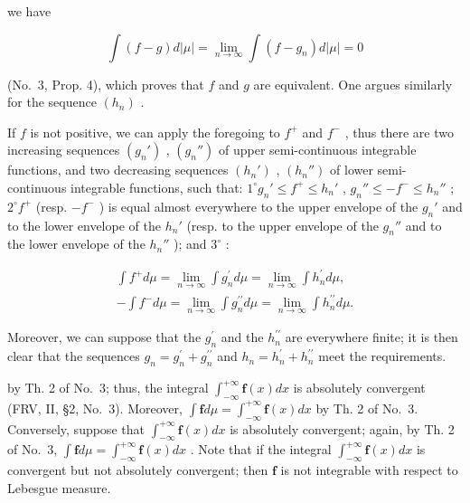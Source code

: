 we have

\[
\int (f - g) d | \mu | = \lim _ {n \rightarrow \infty} \int (f - g _ {n}) d | \mu | = 0
\]

(No.~3, Prop. 4), which proves that \(f\) and \(g\) are equivalent. One argues similarly for the sequence \((h_n)\) .

If \(f\) is not positive, we can apply the foregoing to \(f^{+}\) and \(f^{-}\) , thus there are two increasing sequences \((g_n')\) , \((g_n'')\) of upper semi-continuous integrable functions, and two decreasing sequences \((h_n')\) , \((h_n'')\) of lower semi-continuous integrable functions, such that: \(1^\circ g_n' \leqslant f^{+} \leqslant h_n'\) , \(g_n'' \leqslant -f^{-} \leqslant h_n''\) ; \(2^\circ f^{+}\) (resp. \(-f^{-}\) ) is equal almost everywhere to the upper envelope of the \(g_n'\) and to the lower envelope of the \(h_n'\) (resp. to the upper envelope of the \(g_n''\) and to the lower envelope of the \(h_n''\) ); and \(3^\circ\) :

\[
\begin{array}{r} \int f ^ {+} d \mu = \lim _ {n \to \infty} \int g _ {n} ^ {\prime} d \mu = \lim _ {n \to \infty} \int h _ {n} ^ {\prime} d \mu , \\ - \int f ^ {-} d \mu = \lim _ {n \to \infty} \int g _ {n} ^ {\prime \prime} d \mu = \lim _ {n \to \infty} \int h _ {n} ^ {\prime \prime} d \mu . \end{array}
\]

Moreover, we can suppose that the \(g_{n}^{\prime}\) and the \(h_{n}^{\prime\prime}\) are everywhere finite; it is then clear that the sequences \(g_{n}=g_{n}^{\prime}+g_{n}^{\prime\prime}\) and \(h_{n}=h_{n}^{\prime}+h_{n}^{\prime\prime}\) meet the requirements.

by Th. 2 of No.~3; thus, the integral \(\int_{-\infty}^{+\infty} \mathbf{f}(x) dx\) is absolutely convergent (FRV, II, §2, No.~3). Moreover, \(\int \mathbf{f} d\mu = \int_{-\infty}^{+\infty} \mathbf{f}(x) dx\) by Th. 2 of No.~3. Conversely, suppose that \(\int_{-\infty}^{+\infty} \mathbf{f}(x) dx\) is absolutely convergent; again, by Th. 2 of No.~3, \(\int \mathbf{f} d\mu = \int_{-\infty}^{+\infty} \mathbf{f}(x) dx\) . Note that if the integral \(\int_{-\infty}^{+\infty} \mathbf{f}(x) dx\) is convergent but not absolutely convergent; then \(\mathbf{f}\) is not integrable with respect to Lebesgue measure.

